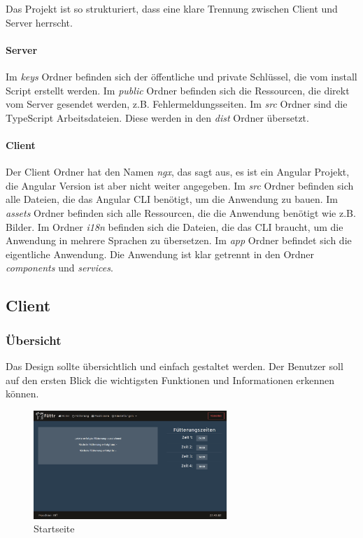Das Projekt ist so strukturiert, dass eine klare Trennung zwischen Client und Server herrscht.
\paragraph*{Server} Im \textit{keys} Ordner befinden sich der öffentliche und private Schlüssel, die vom install Script erstellt werden. Im \textit{public} Ordner befinden sich die Ressourcen, die direkt vom Server gesendet werden, z.B. Fehlermeldungsseiten. Im \textit{src} Ordner sind die TypeScript Arbeitsdateien. Diese werden in den \textit{dist} Ordner übersetzt.
\paragraph*{Client} Der Client Ordner hat den Namen \textit{ngx}, das sagt aus, es ist ein Angular Projekt, die Angular Version ist aber nicht weiter angegeben. Im \textit{src} Ordner befinden sich alle Dateien, die das Angular \ac{CLI} benötigt, um die Anwendung zu bauen. Im \textit{assets} Ordner befinden sich alle Ressourcen, die die Anwendung benötigt wie z.B. Bilder. Im Ordner \textit{i18n} befinden sich die Dateien, die das \ac{CLI} braucht, um die Anwendung in mehrere Sprachen zu übersetzen. Im \textit{app} Ordner befindet sich die eigentliche Anwendung. Die Anwendung ist klar getrennt in den Ordner \textit{components} und \textit{services}.

\subsection{Client}
\label{sec:ums-client}

\subsubsection{Übersicht}
\label{sec:ums-client-ubersicht}
Das Design sollte übersichtlich und einfach gestaltet werden. Der Benutzer soll auf den ersten Blick die wichtigsten Funktionen und Informationen erkennen können. \\

\begin{figure}
\vspace{-10pt}
  \begin{center}
    \includegraphics[width=0.65\textwidth]{Bilder/Greistorfer/Home}
  \end{center}
  \caption{Startseite}
  \label{Startseite}
  \vspace{-10pt}
\end{figure}


